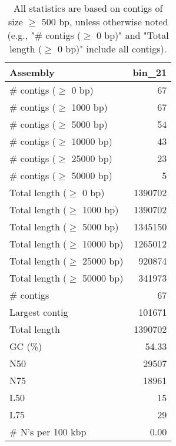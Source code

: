 \documentclass[12pt,a4paper]{article}
\begin{document}
\begin{table}[ht]
\begin{center}
\caption{All statistics are based on contigs of size $\geq$ 500 bp, unless otherwise noted (e.g., "\# contigs ($\geq$ 0 bp)" and "Total length ($\geq$ 0 bp)" include all contigs).}
\begin{tabular}{|l*{1}{|r}|}
\hline
Assembly & bin\_21 \\ \hline
\# contigs ($\geq$ 0 bp) & 67 \\ \hline
\# contigs ($\geq$ 1000 bp) & 67 \\ \hline
\# contigs ($\geq$ 5000 bp) & 54 \\ \hline
\# contigs ($\geq$ 10000 bp) & 43 \\ \hline
\# contigs ($\geq$ 25000 bp) & 23 \\ \hline
\# contigs ($\geq$ 50000 bp) & 5 \\ \hline
Total length ($\geq$ 0 bp) & 1390702 \\ \hline
Total length ($\geq$ 1000 bp) & 1390702 \\ \hline
Total length ($\geq$ 5000 bp) & 1345150 \\ \hline
Total length ($\geq$ 10000 bp) & 1265012 \\ \hline
Total length ($\geq$ 25000 bp) & 920874 \\ \hline
Total length ($\geq$ 50000 bp) & 341973 \\ \hline
\# contigs & 67 \\ \hline
Largest contig & 101671 \\ \hline
Total length & 1390702 \\ \hline
GC (\%) & 54.33 \\ \hline
N50 & 29507 \\ \hline
N75 & 18961 \\ \hline
L50 & 15 \\ \hline
L75 & 29 \\ \hline
\# N's per 100 kbp & 0.00 \\ \hline
\end{tabular}
\end{center}
\end{table}
\end{document}
